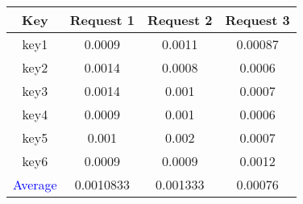 \begin{center}
    \begin{tabular}{c | c | c | c}

        Key & Request 1 & Request 2 & Request 3 \\
        \hline
        key1 & 0.0009 & 0.0011 & 0.00087 \\
        \hline
        key2 &  0.0014 & 0.0008 &  0.0006\\ 
        \hline
        key3 &  0.0014 & 0.001 & 0.0007 \\
        \hline
        key4 &  0.0009& 0.001 & 0.0006\\
        \hline
        key5 &  0.001 &  0.002 & 0.0007\\
        \hline
        key6 &  0.0009 & 0.0009 & 0.0012\\
        \hline
        \textcolor{blue}{Average} & 0.0010833 & 0.001333 & 0.00076\\
        \hline 
    \end{tabular}
\end{center}
